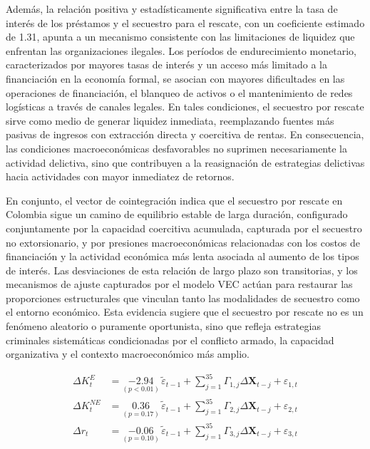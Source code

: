\documentclass[12pt]{article}
\theoremstyle{definition}
\theoremstyle{remark}
\newcommand{\1}{\mathbf{1}}
\begin{document}
Además, la relación positiva y estadísticamente significativa entre la tasa de interés de los préstamos y el secuestro para el rescate, con un coeficiente estimado de 1.31, apunta a un mecanismo consistente con las limitaciones de liquidez que enfrentan las organizaciones ilegales. Los períodos de endurecimiento monetario, caracterizados por mayores tasas de interés y un acceso más limitado a la financiación en la economía formal, se asocian con mayores dificultades en las operaciones de financiación, el blanqueo de activos o el mantenimiento de redes logísticas a través de canales legales. En tales condiciones, el secuestro por rescate sirve como medio de generar liquidez inmediata, reemplazando fuentes más pasivas de ingresos con extracción directa y coercitiva de rentas. En consecuencia, las condiciones macroeconómicas desfavorables no suprimen necesariamente la actividad delictiva, sino que contribuyen a la reasignación de estrategias delictivas hacia actividades con mayor inmediatez de retornos.

En conjunto, el vector de cointegración indica que el secuestro por rescate en Colombia sigue un camino de equilibrio estable de larga duración, configurado conjuntamente por la capacidad coercitiva acumulada, capturada por el secuestro no extorsionario, y por presiones macroeconómicas relacionadas con los costos de financiación y la actividad económica más lenta asociada al aumento de los tipos de interés. Las desviaciones de esta relación de largo plazo son transitorias, y los mecanismos de ajuste capturados por el modelo VEC actúan para restaurar las proporciones estructurales que vinculan tanto las modalidades de secuestro como el entorno económico. Esta evidencia sugiere que el secuestro por rescate no es un fenómeno aleatorio o puramente oportunista, sino que refleja estrategias criminales sistemáticas condicionadas por el conflicto armado, la capacidad organizativa y el contexto macroeconómico más amplio.

\begin{align}
    \Delta K^{E}_t &= \underset{(p < 0.01)}{-2.94} \, \tilde{\varepsilon}_{t-1} + \sum_{j=1}^{35} \Gamma_{1,j} \Delta \mathbf{X}_{t-j} + \varepsilon_{1,t} 
    \label{eq_3} \\
    \Delta K^{NE}_t &= \underset{(p = 0.17)}{0.36} \, \tilde{\varepsilon}_{t-1} + \sum_{j=1}^{35} \Gamma_{2,j} \Delta \mathbf{X}_{t-j} + \varepsilon_{2,t}
    \label{eq_4} \\
    \Delta r_t &= \underset{(p = 0.10)}{-0.06} \, \tilde{\varepsilon}_{t-1} + \sum_{j=1}^{35} \Gamma_{3,j} \Delta \mathbf{X}_{t-j} + \varepsilon_{3,t}
    \label{eq_5}
\end{align}
\end{document}
